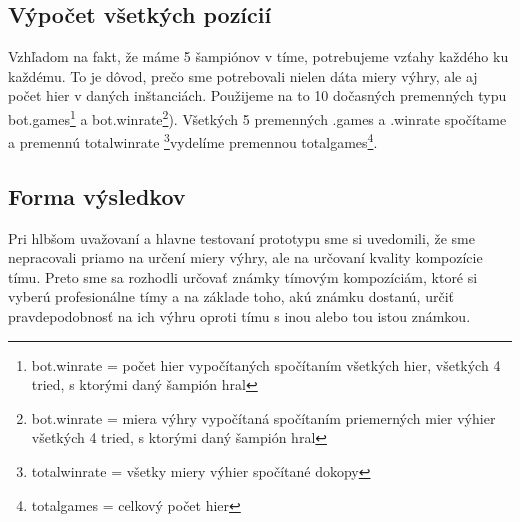 \subsection{Výpočet všetkých pozícií}
Vzhľadom na  fakt, že máme 5 šampiónov v tíme, potrebujeme vzťahy každého ku každému. To je dôvod, prečo sme potrebovali nielen dáta miery výhry, ale aj počet hier v daných inštanciách. Použijeme na to 10 dočasných premenných typu bot.games\footnote{bot.winrate = počet hier vypočítaných spočítaním všetkých hier, všetkých 4 tried, s ktorými daný šampión hral} a bot.winrate\footnote{bot.winrate = miera výhry vypočítaná spočítaním priemerných mier výhier všetkých 4 tried, s ktorými daný šampión hral}). Všetkých 5 premenných .games a .winrate spočítame a premennú totalwinrate \footnote{totalwinrate = všetky miery výhier spočítané dokopy}vydelíme premennou totalgames\footnote{totalgames = celkový počet hier}.

\subsection{Forma výsledkov}
Pri hlbšom uvažovaní a hlavne testovaní prototypu sme si uvedomili, že sme nepracovali priamo na určení miery výhry, ale na určovaní kvality kompozície tímu. Preto sme sa rozhodli určovať známky tímovým kompozíciám, ktoré si vyberú profesionálne tímy a na základe toho, akú známku dostanú, určiť pravdepodobnosť na ich výhru oproti tímu s inou alebo tou istou známkou.

